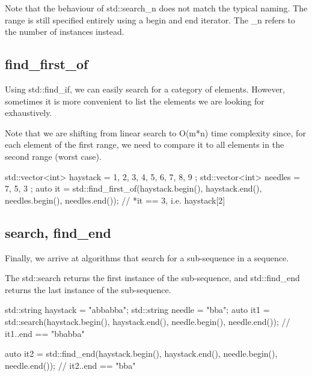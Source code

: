 Note that the behaviour of std::search\_n does not match the typical naming. The range is still specified entirely using a begin and end iterator. The \_n refers to the number of instances instead.

\subsection{find\_first\_of}

Using std::find\_if, we can easily search for a category of elements. However, sometimes it is more convenient to list the elements we are looking for exhaustively.



Note that we are shifting from linear search to O(m*n) time complexity since, for each element of the first range, we need to compare it to all elements in the second range (worst case).

\begin{box-note}
\begin{cppcode}
std::vector<int> haystack = { 1, 2, 3, 4, 5, 6, 7, 8, 9 };
std::vector<int> needles = { 7, 5, 3 };
auto it = std::find_first_of(haystack.begin(), haystack.end(), 
                             needles.begin(), needles.end());
// *it == 3, i.e. haystack[2]
\end{cppcode}
\end{box-note}

\subsection{search, find\_end}

Finally, we arrive at algorithms that search for a sub-sequence in a sequence.



The std::search returns the first instance of the sub-sequence, and std::find\_end returns the last instance of the sub-sequence.

\begin{box-note}
\begin{cppcode}
std::string haystack = "abbabba";
std::string needle = "bba";
auto it1 = std::search(haystack.begin(), haystack.end(), 
                       needle.begin(), needle.end());
// it1..end == "bbabba"

auto it2 = std::find_end(haystack.begin(), haystack.end(), 
                         needle.begin(), needle.end());
// it2..end == "bba"
\end{cppcode}
\end{box-note}


